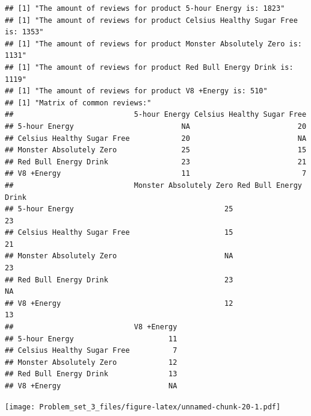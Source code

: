 \documentclass[
]{article}
\begin{document}
\begin{verbatim}
## [1] "The amount of reviews for product 5-hour Energy is: 1823"
## [1] "The amount of reviews for product Celsius Healthy Sugar Free is: 1353"
## [1] "The amount of reviews for product Monster Absolutely Zero is: 1131"
## [1] "The amount of reviews for product Red Bull Energy Drink is: 1119"
## [1] "The amount of reviews for product V8 +Energy is: 510"
## [1] "Matrix of common reviews:"
##                            5-hour Energy Celsius Healthy Sugar Free
## 5-hour Energy                         NA                         20
## Celsius Healthy Sugar Free            20                         NA
## Monster Absolutely Zero               25                         15
## Red Bull Energy Drink                 23                         21
## V8 +Energy                            11                          7
##                            Monster Absolutely Zero Red Bull Energy Drink
## 5-hour Energy                                   25                    23
## Celsius Healthy Sugar Free                      15                    21
## Monster Absolutely Zero                         NA                    23
## Red Bull Energy Drink                           23                    NA
## V8 +Energy                                      12                    13
##                            V8 +Energy
## 5-hour Energy                      11
## Celsius Healthy Sugar Free          7
## Monster Absolutely Zero            12
## Red Bull Energy Drink              13
## V8 +Energy                         NA
\end{verbatim}

\texttt{[image: Problem\_set\_3\_files/figure-latex/unnamed-chunk-20-1.pdf]}
\end{document}
